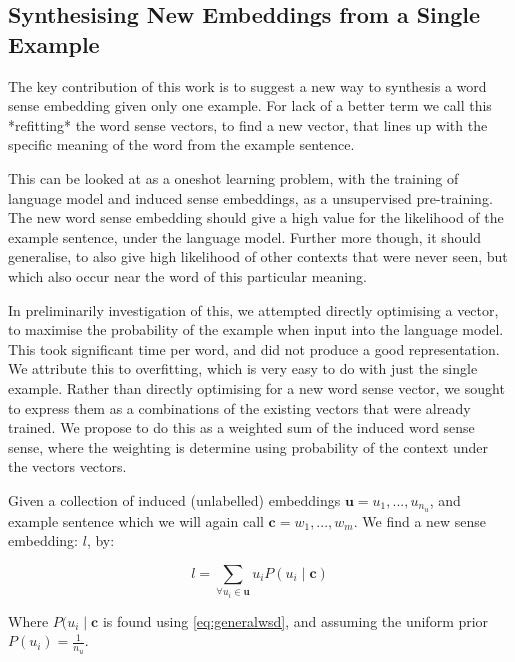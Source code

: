\documentclass{sig-alternate}
\renewcommand{\c}{\mathbf{c}}
\renewcommand{\u}{\mathbf{u}}
\begin{document}



\subsection{Synthesising New Embeddings from a Single Example}

The key contribution of this work is to suggest a new way to synthesis a word sense embedding given only one example. For lack of a better term we call this *refitting* the word sense vectors, to find a new vector, that lines up with the specific meaning of the word from the example sentence.

This can be looked at as a oneshot learning problem, with the training of language model and induced sense embeddings, as a unsupervised pre-training. The new word sense embedding should give a high value for the likelihood of the example sentence, under the language model. Further more though, it should generalise, to also give high likelihood of other contexts that were never seen, but which also occur near the word of this particular meaning.

In preliminarily investigation of this, we attempted directly optimising a vector, to maximise the probability of the example when input into the language model. This took significant time per word, and did not produce a good representation. We attribute this to overfitting, which is very easy to do with just the single example. Rather than directly optimising for a new word sense vector, we sought to express them as a combinations of the existing vectors that were already trained. We propose to do this as a weighted sum of the induced word sense sense, where the weighting is determine using  probability of the context under the vectors vectors.


Given a collection of induced (unlabelled) embeddings $\u={u_1,...,u_{n_u}}$, and example sentence which we will again call $\c={w_1,...,w_m}$. We find a new sense embedding: $l$, by: 

\begin{equation} \label{eq:synth}
l=\sum_{\forall u_i \in \u} u_iP(u_i \mid \c)
\end{equation}

Where $P(u_i \mid \c$ is found using \cref{eq:generalwsd}, and assuming the uniform prior $P(u_i)=\frac{1}{n_u}$.
\end{document}
